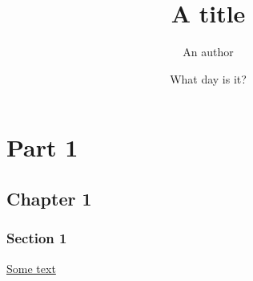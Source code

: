 \documentclass[11pt, letterpaper]{article}
\author{An author}
\title{A title}
\date{What day is it?}
\begin{document}
\maketitle
\newpage
\part{Part 1}
\chapter{Chapter 1}
\section{Section 1}
\par \underline{Some text}
\end{document}
